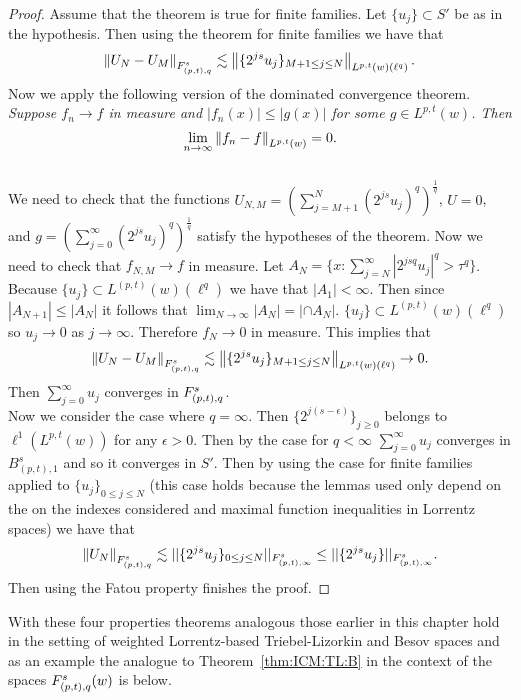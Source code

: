 \begin{proof}
Assume that the theorem is true for finite families. Let $\{u_j\} \subset S'$ be as in the hypothesis. Then using the theorem for finite families we have that 
\begin{equation}
\norm{U_N - U_M}{\itl{(p,t)}{s}{q}} \lesssim \norm{ \{2^{js} u_j\}_{M+1\leq j \leq N}}{L^{p,t}(w)(\ell^q)}.
\end{equation}
Now we apply the following version of the dominated convergence theorem. 
\\
\bigskip
\textit{Suppose $f_n \rightarrow f$ in measure and $|f_n (x)| \leq |g(x)|$ for some $g\in L^{p,t}(w)$. Then $$\lim_{n\rightarrow\infty} \norm{f_n-f}{L^{p,t}(w)} = 0.$$}
\\
\bigskip
We need to check that the functions $U_{N,M} = \left(\sum_{j=M+1}^{N} (2^{js} u_j)^q \right)^\frac{1}{q}$, $U=0$, and $g = \left(\sum_{j=0}^\infty (2^{js}u_j)^q \right)^\frac{1}{q}$ satisfy the hypotheses of the theorem. Now we need to check that $f_{N,M}\rightarrow f$ in measure. Let $A_N = \{ x : \sum^\infty_{j=N} |2^{jsq}u_j|^q > \tau^q \}$. Because $\{u_j\} \subset L^{(p,t)}(w)(\ell^{q})$ we have that $|A_1| < \infty$. Then since $|A_{N+1}| \leq |A_{N}|$ it follows that $\lim_{N\rightarrow\infty} |A_N| = |\cap A_N|$. $\{u_j\} \subset L^{(p,t)}(w)(\ell^{q})$ so $u_j \rightarrow 0$ as $j\rightarrow\infty$. Therefore $f_N \rightarrow 0$ in measure. This implies that 
$$ \norm{U_N - U_M}{\itl{(p,t)}{s}{q}} \lesssim \norm{\{2^{js}u_j\}_{M+1\leq j \leq N}}{L^{p,t}(w)(\ell^q)} \rightarrow 0.$$
Then $\sum_{j=0}^\infty u_j$ converges in $\itl{(p,t)}{s}{q}$. 
\\
Now we consider the case where $q=\infty$. Then $\{2^{j(s-\epsilon)}\}_{j\geq0}$ belongs to $\ell^1(L^{p,t}(w))$ for any $\epsilon >0$. Then by the case for $q<\infty$ $\sum_{j=0}^\infty u_j$ converges in $B^s_{(p,t),1}$ and so it converges in $S'$. Then by using the case for finite families applied to $\{u_j\}_{0\leq j \leq N}$ (this case holds because the lemmas used only depend on the on the indexes considered and maximal function inequalities in Lorrentz spaces) we have that 
\[ \norm{U_N}{\itl{(p,t)}{s}{q}} \lesssim ||\{2^{js}u_j\}_{0\leq j \leq N}||_{F^s_{(p,t),\infty}} \leq ||\{2^{js}u_j\}||_{F^s_{(p,t),\infty}}. \] Then using the Fatou property finishes the proof.
\end{proof}

With these four properties theorems analogous those earlier in this chapter hold in the setting of weighted Lorrentz-based Triebel-Lizorkin and Besov spaces and as an example the analogue to Theorem~\ref{thm:ICM:TL:B} in the context of the spaces $\itlw{(p,t)}{s}{q}{w}$ is below.


